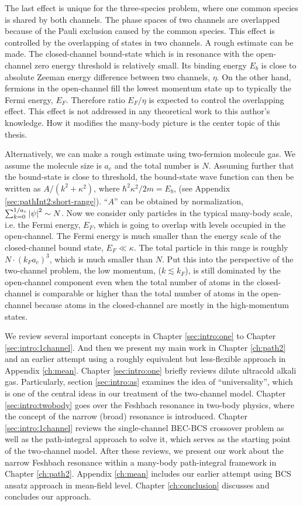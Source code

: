 The last effect is unique for the three-species problem, where one common species is shared by both channels.  The phase spaces of two channels are overlapped because of the Pauli exclusion caused by the common species. This effect is controlled by the overlapping of states in two channels. A rough estimate can be made.  The closed-channel bound-state which is in resonance with the open-channel zero energy threshold is relatively small.  Its binding energy $E_b$ is close to absolute Zeeman energy difference between two channels, $\eta$.  On the other hand, fermions in the open-channel fill the lowest  momentum state up to typically the Fermi energy, $E_F$.  Therefore ratio $E_F/\eta$ is expected to control the overlapping effect. This effect is not addressed in any theoretical work to this author's knowledge.  How it modifies the many-body picture is the center topic of this thesis. 

Alternatively, we can make a rough estimate using two-fermion molecule gas. We assume the molecule size is $a_{c}$ and the total number is $N$.  Assuming further that the bound-state is close to threshold,   the bound-state wave function can then be written as $A/(k^{2}+\kappa^{2})$, where $\hbar^{2}\kappa^{2}/2m=E_{b}$, (see Appendix \ref{sec:pathInt2:short-range}). ``$A$'' can be obtained by normalization, $\sum_{k=0}^{1/a_{c}}\left\lvert{\psi}\right\rvert^{2}\sim{}N$. Now  we consider only particles in the typical many-body scale, i.e. the Fermi energy, $E_{F}$, which is going to overlap with levels occupied in the open-channel. The Fermi energy is much smaller than the energy scale of the closed-channel bound state, $E_{F}\ll\kappa$.  The total particle in this range is roughly $N\cdot(k_{F}a_{c})^{3}$, which is much smaller than $N$. Put this into the perspective of the two-channel problem, the low momentum,  ($k\lesssim{}k_F$), is still dominated by the open-channel component even when the total number of atoms in the closed-channel is comparable or higher than the total number  of atoms in the open-channel because atoms in the closed-channel are mostly in the high-momentum states.     

 We review several important concepts in Chapter \ref{sec:intro:one} to Chapter \ref{sec:intro:1channel}. And then we present my main work in Chapter \ref{ch:path2} and an earlier attempt using a roughly equivalent but less-flexible approach in Appendix \ref{ch:mean}.  Chapter \ref{sec:intro:one} briefly reviews  dilute ultracold alkali gas.   Particularly, section \ref{sec:intro:as} examines the idea of ``universality'', which is one of the central ideas in our treatment of the two-channel model.  Chapter \ref{sec:intro:twobody} goes over the Feshbach resonance in two-body physics, where the concept of  the narrow (broad) resonance is introduced. Chapter \ref{sec:intro:1channel} reviews the single-channel BEC-BCS crossover problem as well as the path-integral approach to solve it, which serves as the starting point of the two-channel model. After these reviews, we present our work about the narrow Feshbach resonance within a many-body path-integral framework in  Chapter \ref{ch:path2}.   Appendix \ref{ch:mean} includes our earlier attempt   using BCS ansatz  approach in mean-field level.  Chapter \ref{ch:conclusion} discusses and concludes our approach.  

